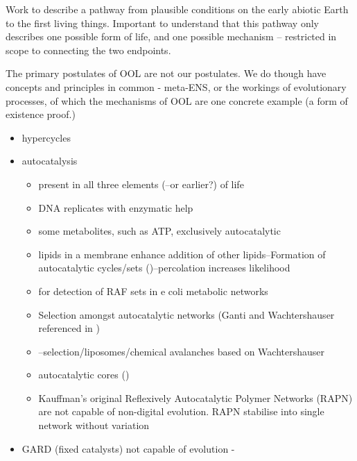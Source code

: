 Work to describe a pathway from plausible conditions on the early abiotic Earth to the first living things. Important to understand that this pathway only describes one possible form of life, and one possible mechanism -- restricted in scope to connecting the two endpoints.

The primary postulates of OOL are not our postulates. We do though have concepts and principles in common - meta-ENS, or the workings of evolutionary processes, of which the mechanisms of OOL are one concrete example (a form of existence proof.)

\begin{itemize}
	\item
	      hypercycles \autocite{Eigen1971}
	\item
	      autocatalysis
	      \begin{itemize}
	      	\item
	      	      present in all three elements (\autocite{Ganti:2003hl}--or
	      	      earlier?) of life
	      	\item
	      	      DNA replicates with enzymatic help
	      	\item
	      	      some metabolites, such as ATP, exclusively autocatalytic
	      	\item
	      	      lipids in a membrane enhance addition of other lipids--Formation of
	      	      autocatalytic cycles/sets (\autocite{Hordijk2004})--percolation increases
	      	      likelihood
	      	\item
	      	      \autocite{Sousa2015} for detection of RAF sets in e coli metabolic
	      	      networks
	      	\item
	      	      Selection amongst autocatalytic networks (Ganti and Wachtershauser referenced in \autocite{Fernando:2005ly})
	      	\item
	      	      \autocite{Fernando:2007pf}--selection/liposomes/chemical avalanches
	      	      based on Wachtershauser
	      	\item
	      	      autocatalytic cores (\autocite{Vasas2012})
	      	\item
	      	      Kauffman's original Reflexively Autocatalytic Polymer Networks
	      	      (RAPN) \autocite{Kauffman1986,Farmer1986} are not capable of
	      	      non-digital evolution. RAPN stabilise into single network without
	      	      variation
	      \end{itemize}
	\item
	      GARD (fixed catalysts) \autocite{Segre1998} not capable of evolution -

\end{itemize}
